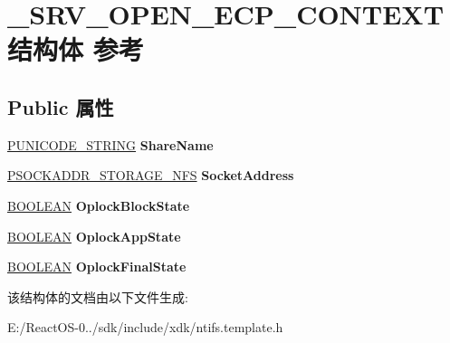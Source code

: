 \hypertarget{struct___s_r_v___o_p_e_n___e_c_p___c_o_n_t_e_x_t}{}\section{\+\_\+\+S\+R\+V\+\_\+\+O\+P\+E\+N\+\_\+\+E\+C\+P\+\_\+\+C\+O\+N\+T\+E\+X\+T结构体 参考}
\label{struct___s_r_v___o_p_e_n___e_c_p___c_o_n_t_e_x_t}
\subsection*{Public 属性}
\begin{DoxyCompactItemize}
\item 
\mbox{\label{struct___s_r_v___o_p_e_n___e_c_p___c_o_n_t_e_x_t_a69532ca5eac11cf8d4bf98303322a4e3}} 
\hyperlink{struct___u_n_i_c_o_d_e___s_t_r_i_n_g}{P\+U\+N\+I\+C\+O\+D\+E\+\_\+\+S\+T\+R\+I\+NG} {\bfseries Share\+Name}
\item 
\mbox{\label{struct___s_r_v___o_p_e_n___e_c_p___c_o_n_t_e_x_t_a79787f0b91af7a3a75efca61c063cc85}} 
\hyperlink{structsockaddr__storage}{P\+S\+O\+C\+K\+A\+D\+D\+R\+\_\+\+S\+T\+O\+R\+A\+G\+E\+\_\+\+N\+FS} {\bfseries Socket\+Address}
\item 
\mbox{\label{struct___s_r_v___o_p_e_n___e_c_p___c_o_n_t_e_x_t_a9df829f15dd2f2d50aec6d86319c4d42}} 
\hyperlink{_processor_bind_8h_a112e3146cb38b6ee95e64d85842e380a}{B\+O\+O\+L\+E\+AN} {\bfseries Oplock\+Block\+State}
\item 
\mbox{\label{struct___s_r_v___o_p_e_n___e_c_p___c_o_n_t_e_x_t_a3cd0c428de6634c3483dd9ad0ea9018e}} 
\hyperlink{_processor_bind_8h_a112e3146cb38b6ee95e64d85842e380a}{B\+O\+O\+L\+E\+AN} {\bfseries Oplock\+App\+State}
\item 
\mbox{\label{struct___s_r_v___o_p_e_n___e_c_p___c_o_n_t_e_x_t_aa12d4ab5352e3ef1c0ab16c6ef0d40fa}} 
\hyperlink{_processor_bind_8h_a112e3146cb38b6ee95e64d85842e380a}{B\+O\+O\+L\+E\+AN} {\bfseries Oplock\+Final\+State}
\end{DoxyCompactItemize}


该结构体的文档由以下文件生成\+:\begin{DoxyCompactItemize}
\item 
E\+:/\+React\+O\+S-\/0../sdk/include/xdk/ntifs.\+template.\+h\end{DoxyCompactItemize}

